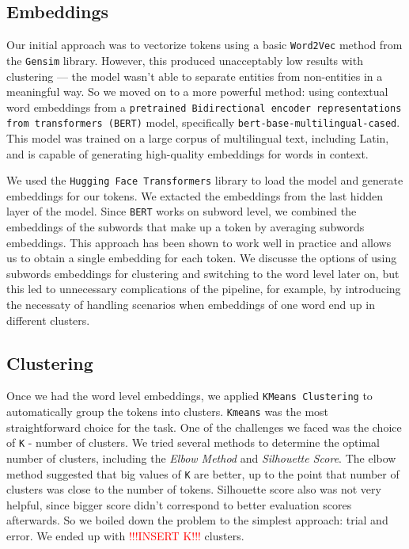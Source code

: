 \documentclass[11pt]{article}
\begin{document}
\subsection{Embeddings}

Our initial approach was to vectorize tokens using a basic \texttt{Word2Vec} method from the \texttt{Gensim} library. However, this produced 
unacceptably low results with clustering — the model wasn’t able to separate entities from non-entities in a meaningful way. So we moved on to
a more powerful method: using contextual word embeddings from a \texttt{pretrained Bidirectional encoder representations from transformers (BERT)} model,
specifically \texttt{bert-base-multilingual-cased}. This model was trained on a large corpus of multilingual text, including Latin, and is
capable of generating high-quality embeddings for words in context.

We used the \texttt{Hugging Face Transformers} library to load the model and generate embeddings for our tokens. We extacted the embeddings
from the last hidden layer of the model. Since \texttt{BERT} works on subword level, we combined the embeddings of the subwords that make up
a token by averaging subwords embeddings. This approach has been shown to work well in practice and allows us to obtain a single embedding for
each token. We discusse the options of using subwords embeddings for clustering and switching to the word level later on, but this led to
unnecessary complications of the pipeline, for example, by introducing the necessaty of handling scenarios when embeddings of one word end up
in different clusters.

\subsection{Clustering}

Once we had the word level embeddings, we applied \texttt{KMeans Clustering} to automatically group the tokens into clusters. \texttt{Kmeans}
was the most straightforward choice for the task. One of the challenges we faced was the choice of \texttt{K} - number of clusters. We tried
several methods to determine the optimal number of clusters, including the \textit{Elbow Method} and \textit{Silhouette Score}. 
The elbow method suggested that big values of \texttt{K} are better, up to the point that number of clusters was close to the number of tokens.
Silhouette score also was not very helpful, since bigger score didn't correspond to better evaluation scores afterwards. So we boiled down the
problem to the simplest approach: trial and error. We ended up with \textcolor{red}{!!!INSERT K!!!} clusters.
\end{document}

